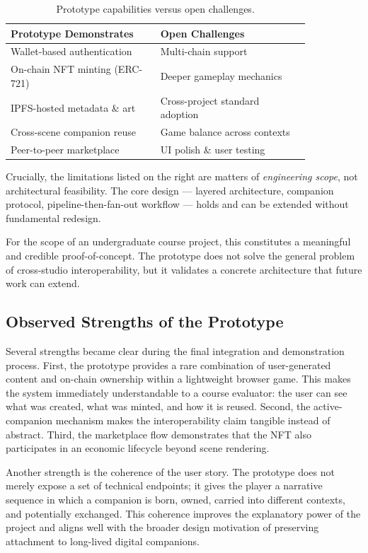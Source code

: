 \documentclass[sigconf]{acmart}
\begin{document}
\begin{table}[t]
  \caption{Prototype capabilities versus open challenges.}
  \label{tab:strengths-challenges}
  \centering
  \begin{tabular}{p{0.42\linewidth}p{0.42\linewidth}}
    \toprule
    \textbf{Prototype Demonstrates} & \textbf{Open Challenges} \\
    \midrule
    Wallet-based authentication    & Multi-chain support \\
    On-chain NFT minting (ERC-721) & Deeper gameplay mechanics \\
    IPFS-hosted metadata \& art    & Cross-project standard adoption \\
    Cross-scene companion reuse    & Game balance across contexts \\
    Peer-to-peer marketplace       & UI polish \& user testing \\
    \bottomrule
  \end{tabular}
\end{table}

Crucially, the limitations listed on the right are matters of \emph{engineering scope}, not architectural feasibility. The core design --- layered architecture, companion protocol, pipeline-then-fan-out workflow --- holds and can be extended without fundamental redesign.

For the scope of an undergraduate course project, this constitutes a meaningful and credible proof-of-concept. The prototype does not solve the general problem of cross-studio interoperability, but it validates a concrete architecture that future work can extend.

\subsection{Observed Strengths of the Prototype}
Several strengths became clear during the final integration and demonstration process. First, the prototype provides a rare combination of user-generated content and on-chain ownership within a lightweight browser game. This makes the system immediately understandable to a course evaluator: the user can see what was created, what was minted, and how it is reused. Second, the active-companion mechanism makes the interoperability claim tangible instead of abstract. Third, the marketplace flow demonstrates that the NFT also participates in an economic lifecycle beyond scene rendering.

Another strength is the coherence of the user story. The prototype does not merely expose a set of technical endpoints; it gives the player a narrative sequence in which a companion is born, owned, carried into different contexts, and potentially exchanged. This coherence improves the explanatory power of the project and aligns well with the broader design motivation of preserving attachment to long-lived digital companions.
\end{document}

